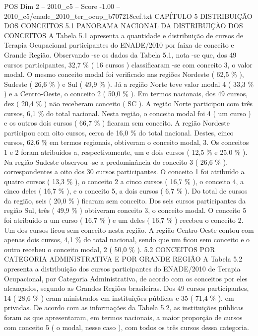 \begin{textsample}{POS Dim 2 – 2010\_c5 – Score -1.00 – 2010\_c5/enade\_2010\_ter\_ocup\_b707218cef.txt}  \label{ex:f2_pos_328}
CAPÍTULO 5 DISTRIBUIÇÃO DOS CONCEITOS 5.1 PANORAMA NACIONAL DA DISTRIBUIÇÃO DOS CONCEITOS A Tabela 5.1 apresenta a quantidade e distribuição de cursos de Terapia Ocupacional participantes do ENADE/2010 por faixa de conceito e Grande Região.
Observando -se os dados da Tabela 5.1, nota -se que, dos 49 cursos participantes, 32,7 \% ( 16 cursos ) classificaram -se com conceito 3, o valor modal.
O mesmo conceito modal foi verificado nas regiões Nordeste ( 62,5 \% ), Sudeste ( 26,6 \% ) e Sul ( 49,9 \% ).
Já a região Norte teve valor modal 4 ( 33,3 \% ) e a Centro-Oeste, o conceito 2 ( 50,0 \% ).
Em termos nacionais, dos 49 cursos, dez ( 20,4 \% ) não receberam conceito ( SC ).
A região Norte participou com três cursos, 6,1 \% do total nacional.
Nesta região, o conceito modal foi 4 ( um curso ) e os outros dois cursos ( 66,7 \% ) ficaram sem conceito.
A região Nordeste participou com oito cursos, cerca de 16,0 \% do total nacional.
Destes, cinco cursos, 62,6 \% em termos regionais, obtiveram o conceito modal, 3.
Os conceitos 1 e 2 foram atribuídos a, respectivamente, um e dois cursos ( 12,5 \% e 25,0 \% ).
Na região Sudeste observou -se a predominância do conceito 3 ( 26,6 \% ), correspondentes a oito dos 30 cursos participantes.
O conceito 1 foi atribuído a quatro cursos ( 13,3 \% ), o conceito 2 a cinco cursos ( 16,7 \% ), o conceito 4, a cinco deles ( 16,7 \% ), e o conceito 5, a dois cursos ( 6,7 \% ).
Do total de cursos da região, seis ( 20,0 \% ) ficaram sem conceito.
Dos seis cursos participantes da região Sul, três ( 49,9 \% ) obtiveram conceito 3, o conceito modal.
O conceito 5 foi atribuído a um curso ( 16,7 \% ) e um deles ( 16,7 \% ) recebeu o conceito 2.
Um dos cursos ficou sem conceito nesta região.
A região Centro-Oeste contou com apenas dois cursos, 4,1 \% do total nacional, sendo que um ficou sem conceito e o outro recebeu o conceito modal, 2 ( 50,0 \% ). 5.2 CONCEITOS POR CATEGORIA ADMINISTRATIVA E POR GRANDE REGIÃO A Tabela 5.2 apresenta a distribuição dos cursos participantes do ENADE/2010 de Terapia Ocupacional, por Categoria Administrativa, de acordo com os conceitos por eles alcançados, segundo as Grandes Regiões brasileiras.
Dos 49 cursos participantes, 14 ( 28,6 \% ) eram ministrados em instituições públicas e 35 ( 71,4 \% ), em privadas.
De acordo com as informações da Tabela 5.2, as instituições públicas foram as que apresentaram, em termos nacionais, a maior proporção de cursos com conceito 5 ( o modal, nesse caso ), com todos os três cursos dessa categoria.

\end{textsample}
